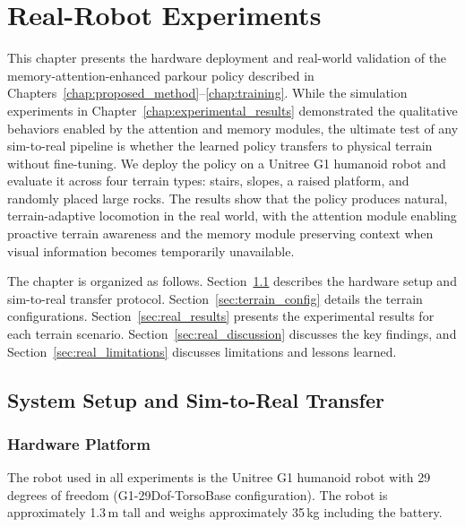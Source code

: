 \chapter{Real-Robot Experiments}
\label{chap:real_robot}

This chapter presents the hardware deployment and real-world validation of the memory-attention-enhanced parkour policy described in Chapters~\ref{chap:proposed_method}--\ref{chap:training}. While the simulation experiments in Chapter~\ref{chap:experimental_results} demonstrated the qualitative behaviors enabled by the attention and memory modules, the ultimate test of any sim-to-real pipeline is whether the learned policy transfers to physical terrain without fine-tuning. We deploy the policy on a Unitree G1 humanoid robot and evaluate it across four terrain types: stairs, slopes, a raised platform, and randomly placed large rocks. The results show that the policy produces natural, terrain-adaptive locomotion in the real world, with the attention module enabling proactive terrain awareness and the memory module preserving context when visual information becomes temporarily unavailable.

The chapter is organized as follows. Section~\ref{sec:system_setup} describes the hardware setup and sim-to-real transfer protocol. Section~\ref{sec:terrain_config} details the terrain configurations. Section~\ref{sec:real_results} presents the experimental results for each terrain scenario. Section~\ref{sec:real_discussion} discusses the key findings, and Section~\ref{sec:real_limitations} discusses limitations and lessons learned.

\section{System Setup and Sim-to-Real Transfer}
\label{sec:system_setup}

\subsection{Hardware Platform}
\label{sec:hardware_platform}

The robot used in all experiments is the Unitree G1 humanoid robot with 29 degrees of freedom (G1-29Dof-TorsoBase configuration). The robot is approximately 1.3\,m tall and weighs approximately 35\,kg including the battery.

